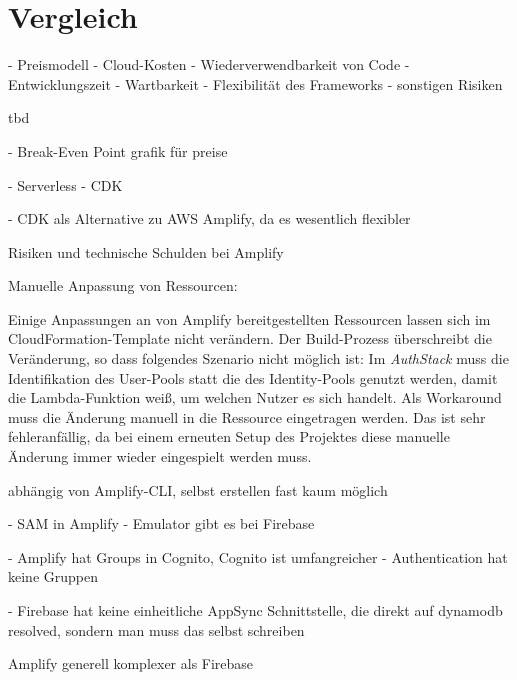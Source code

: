 \chapter{Vergleich}

- Preismodell
- Cloud-Kosten
- Wiederverwendbarkeit von Code
- Entwicklungszeit
- Wartbarkeit
- Flexibilität des Frameworks
- sonstigen Risiken

tbd

- Break-Even Point grafik für preise

- Serverless
- CDK

- CDK als Alternative zu AWS Amplify, da es wesentlich flexibler

Risiken und technische Schulden bei Amplify

Manuelle Anpassung von Ressourcen:

Einige Anpassungen an von Amplify bereitgestellten Ressourcen lassen sich im CloudFormation-Template nicht verändern. Der Build-Prozess überschreibt die Veränderung, so dass folgendes Szenario nicht möglich ist: Im \textit{AuthStack} muss die Identifikation des User-Pools statt die des Identity-Pools genutzt werden, damit die Lambda-Funktion weiß, um welchen Nutzer es sich handelt. Als Workaround muss die Änderung manuell in die Ressource eingetragen werden. Das ist sehr fehleranfällig, da bei einem erneuten Setup des Projektes diese manuelle Änderung immer wieder eingespielt werden muss.

abhängig von Amplify-CLI, selbst erstellen fast kaum möglich


- SAM in Amplify
- Emulator gibt es bei Firebase

- Amplify hat Groups in Cognito, Cognito ist umfangreicher
- Authentication hat keine Gruppen

- Firebase hat keine einheitliche AppSync Schnittstelle, die direkt auf dynamodb resolved, sondern man muss das selbst schreiben

Amplify generell komplexer als Firebase
